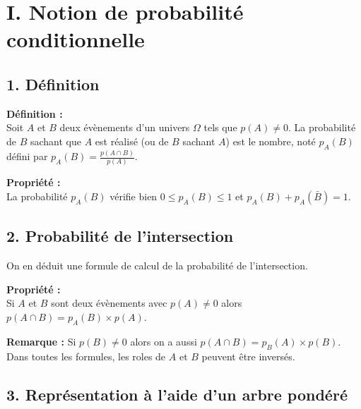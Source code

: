 \documentclass[11pt,a4paper]{article}
\title{\doctitre}
\author{\doctheme\text{ - }\doctype}
\date{}
\begin{document}
\maketitle
\pagestyle{custom}
\thispagestyle{custom}

\section*{I. Notion de probabilité conditionnelle}

\subsection*{1. Définition}

\begin{mdframed}[style=definitionStyle]
  \textbf{Définition :} ~\\
  Soit $A$ et $B$ deux évènements d'un univers $\Omega$ tels que $p(A)\not= 0$.
  La probabilité de $B$ sachant que $A$ est réalisé (ou de $B$ sachant $A$) est le nombre, noté $p_A(B)$ défini par $\displaystyle{}p_A(B)=\frac{p(A\cap B)}{p(A)}$.
\end{mdframed}

\begin{mdframed}[style=proprieteStyle]
  \textbf{Propriété :} ~\\
  La probabilité $p_A(B)$ vérifie bien $0\leq p_A(B)\leq1$ et $p_A(B)+p_A(\bar B)=1$.
\end{mdframed}

\subsection*{2. Probabilité de l'intersection}

On en déduit une formule de calcul de la probabilité de l'intersection.

\begin{mdframed}[style=proprieteStyle]
  \textbf{Propriété :} ~\\
  Si $A$ et $B$ sont deux évènements avec $p(A)\not=0$ alors $p(A\cap B)=p_A(B)\times p(A)$.
\end{mdframed}

\textbf{Remarque :} Si $p(B)\not=0$ alors on a aussi $p(A\cap B)=p_B(A)\times p(B)$. Dans toutes les formules, les roles de $A$ et $B$ peuvent être inversés.

\subsection*{3. Représentation à l'aide d'un arbre pondéré}
\end{document}

